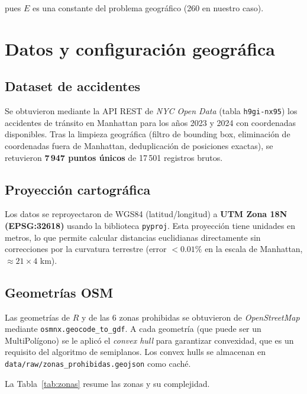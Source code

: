 \documentclass[11pt,a4paper]{article}
\theoremstyle{definition}
\theoremstyle{remark}
\begin{document}
pues $E$ es una constante del problema geográfico (260 en nuestro caso).

\section{Datos y configuración geográfica}
\label{sec:data}

\subsection{Dataset de accidentes}

Se obtuvieron mediante la API REST de \emph{NYC Open Data}
(tabla \texttt{h9gi-nx95}) los accidentes de tránsito en Manhattan para los
años 2023 y 2024 con coordenadas disponibles.  Tras la limpieza geográfica
(filtro de bounding box, eliminación de coordenadas fuera de Manhattan,
deduplicación de posiciones exactas), se retuvieron \textbf{7\,947 puntos
únicos} de 17\,501 registros brutos.

\subsection{Proyección cartográfica}

Los datos se reproyectaron de WGS84 (latitud/longitud) a \textbf{UTM Zona 18N
(EPSG:32618)} usando la biblioteca \texttt{pyproj}.  Esta proyección tiene
unidades en metros, lo que permite calcular distancias euclidianas directamente
sin correcciones por la curvatura terrestre (error $< 0.01\%$ en la escala de
Manhattan, $\approx 21 \times 4$ km).

\subsection{Geometrías OSM}
\label{sec:osm}

Las geometrías de $R$ y de las 6 zonas prohibidas se obtuvieron de
\emph{OpenStreetMap} mediante \texttt{osmnx.geocode\_to\_gdf}.  A cada
geometría (que puede ser un MultiPolígono) se le aplicó el \emph{convex hull}
para garantizar convexidad, que es un requisito del algoritmo de semiplanos.
Los convex hulls se almacenan en \texttt{data/raw/zonas\_prohibidas.geojson}
como caché.

La Tabla~\ref{tab:zonas} resume las zonas y su complejidad.
\end{document}
